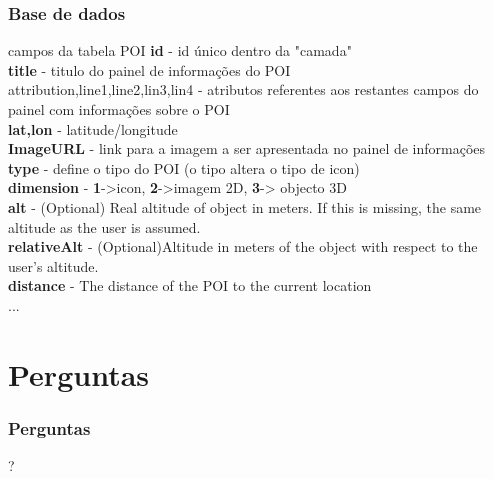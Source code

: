 \documentclass{beamer}
\begin{document}
\begin{frame} \frametitle{Base de dados}
\begin{block}{campos da tabela POI}
\textbf{id} - id único dentro da "camada"\\
\textbf{title} - titulo do painel de informações do POI\\
attribution,line1,line2,lin3,lin4 - atributos referentes aos restantes campos do painel com informações sobre o POI\\
\textbf{lat,lon} - latitude/longitude\\
\textbf{ImageURL} - link para a imagem a ser apresentada no painel de informações\\
\textbf{type} - define o tipo do POI (o tipo altera o tipo de icon)\\
\textbf{dimension} - \textbf{1}->icon, \textbf{2}->imagem 2D, \textbf{3}-> objecto 3D\\
\textbf{alt} - (Optional) Real altitude of object in meters. If this is missing, the same altitude as the user is assumed.\\
\textbf{relativeAlt} - (Optional)Altitude in meters of the object with respect to the user's altitude.\\
\textbf{distance} - The distance of the POI to the current location\\

...
\end{block}
\end{frame}


\section*{Perguntas}
\begin{frame} \frametitle{Perguntas}
\begin{center}\huge{?}\end{center}
\end{frame}
\end{document}
